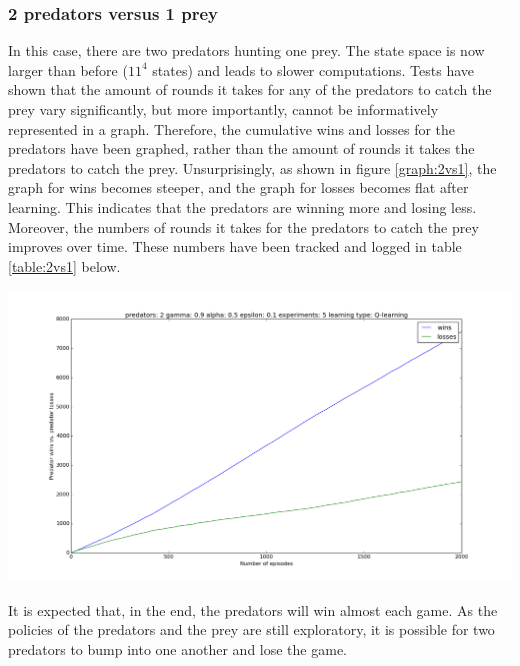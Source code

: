 \subsubsection{2 predators versus 1 prey}
In this case, there are two predators hunting one prey. The state space is now larger than before ($11^4$ states) and leads to slower computations. Tests have shown that the amount of rounds it takes for any of the predators to catch the prey vary significantly, but more importantly, cannot be informatively represented in a graph. Therefore, the cumulative wins and losses for the predators have been graphed, rather than the amount of rounds it takes the predators to catch the prey. Unsurprisingly,  as shown in figure \ref{graph:2vs1}, the graph for wins becomes steeper, and the graph for losses becomes flat after learning. This indicates that the predators are winning more and losing less. Moreover, the numbers of rounds it takes for the predators to catch the prey improves over time. These numbers have been tracked and logged in table \ref{table:2vs1} below.

\begin{center}
	\includegraphics[scale=0.3]{2_predators_q_learning}
	\label{graph:2vs1}
\end{center}


It is expected that, in the end, the predators will win almost each game. As the policies of the predators and the prey are still exploratory, it is possible for two predators to bump into one another and lose the game.

